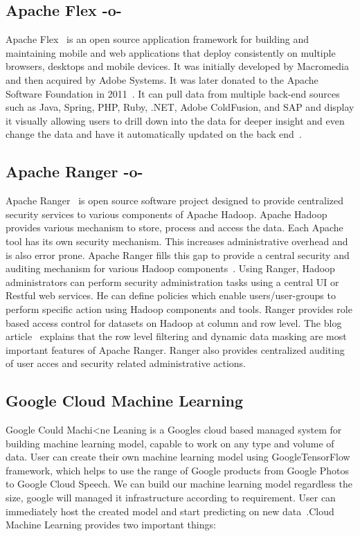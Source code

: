 \subsection{Apache Flex -o-}

Apache Flex~\cite{www-flex} is an open source application framework
for building and maintaining mobile and web applications that deploy
consistently on multiple browsers, desktops and mobile devices. It was
initially developed by Macromedia and then acquired by Adobe
Systems. It was later donated to the Apache Software Foundation in
2011~\cite{blog-flex}. It can pull data from multiple back-end sources
such as Java, Spring, PHP, Ruby, .NET, Adobe ColdFusion, and SAP and
display it visually allowing users to drill down into the data for
deeper insight and even change the data and have it automatically
updated on the back end~\cite{wiki-flex}.

\subsection{Apache Ranger -o-}

Apache Ranger~\cite{www-apache-ranger} is open source software project
designed to provide centralized security services to various
components of Apache Hadoop. Apache Hadoop provides various mechanism
to store, process and access the data. Each Apache tool has its own
security mechanism. This increases administrative overhead and is also
error prone.  Apache Ranger fills this gap to provide a central
security and auditing mechanism for various Hadoop
components~\cite{www-ranger-architecture}. Using Ranger, Hadoop
administrators can perform security administration tasks using a
central UI or Restful web services. He can define policies which
enable users/user-groups to perform specific action using Hadoop
components and tools. Ranger provides role based access control for
datasets on Hadoop at column and row level.  The blog
article~\cite{www-ranger-key-features} explains that the row level
filtering and dynamic data masking are most important features of
Apache Ranger. Ranger also provides centralized auditing of user acces
and security related administrative actions.
     
\subsection{Google Cloud Machine Learning}
     
Google Could Machi<ne Leaning is a Googles cloud based managed system
for building machine learning model, capable to work on any type and
volume of data. User can create their own machine learning model using
GoogleTensorFlow framework, which helps to use the range of Google
products from Google Photos to Google Cloud Speech.  We can build our
machine learning model regardless the size, google will managed it
infrastructure according to requirement. User can immediately host the
created model and start predicting on new
data~\cite{www-googlecloudmachinelearning}.Cloud Machine Learning
provides two important things:
     
